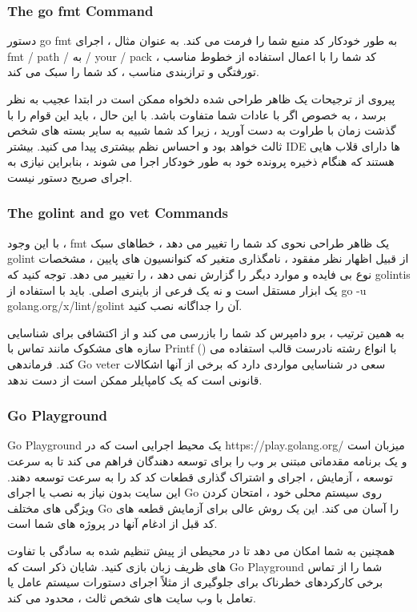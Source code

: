 \documentclass[12pt]{book}
\begin{document}
\subsubsection{The go fmt Command}
دستور go fmt به طور خودکار کد منبع شما را فرمت می کند.
به عنوان مثال ، اجرای fmt / path / به / your / pack کد شما را با اعمال استفاده از خطوط مناسب ، تورفتگی و ترازبندی مناسب ، کد شما را سبک می کند.

پیروی از ترجیحات یک ظاهر طراحی شده دلخواه ممکن است در ابتدا عجیب به نظر برسد ، به خصوص اگر با عادات شما متفاوت باشد.
با این حال ، باید این قوام را با گذشت زمان با طراوت به دست آورید ، زیرا کد شما شبیه به سایر بسته های شخص ثالث خواهد بود و احساس نظم بیشتری پیدا می کنید.
بیشتر IDE ها دارای قلاب هایی هستند که هنگام ذخیره پرونده خود به طور خودکار اجرا می شوند ، بنابراین نیازی به اجرای صریح دستور نیست.
\subsubsection{The golint and go vet Commands}
با این وجود ، fmt یک ظاهر طراحی نحوی کد شما را تغییر می دهد ، خطاهای سبک golint از قبیل اظهار نظر مفقود ، نامگذاری متغیر که کنوانسیون های پایین ، مشخصات نوع بی فایده و موارد دیگر را گزارش نمی دهد ، را تغییر می دهد.
توجه کنید که golintis یک ابزار مستقل است و نه یک فرعی از باینری اصلی.
باید با استفاده از go -u golang.org/x/lint/golint آن را جداگانه نصب کنید.

به همین ترتیب ، برو دامپرس کد شما را بازرسی می کند و از اکتشافی برای شناسایی سازه های مشکوک مانند تماس با Printf () با انواع رشته نادرست قالب استفاده می کند.
فرماندهی Go veter سعی در شناسایی مواردی دارد که برخی از آنها اشکالات قانونی است که یک کامپایلر ممکن است از دست ندهد.
\subsubsection{Go Playground}
Go Playground یک محیط اجرایی است که در https://play.golang.org/ میزبان است و یک برنامه مقدماتی مبتنی بر وب را برای توسعه دهندگان فراهم می کند تا به سرعت توسعه ، آزمایش ، اجرای و اشتراک گذاری قطعات کد کد را به سرعت توسعه دهند.
این سایت بدون نیاز به نصب یا اجرای Go روی سیستم محلی خود ، امتحان کردن ویژگی های مختلف Go را آسان می کند.
این یک روش عالی برای آزمایش قطعه های کد قبل از ادغام آنها در پروژه های شما است.

همچنین به شما امکان می دهد تا در محیطی از پیش تنظیم شده به سادگی با تفاوت های ظریف زبان بازی کنید.
شایان ذکر است که Go Playground شما را از تماس برخی کارکردهای خطرناک برای جلوگیری از مثلاً اجرای دستورات سیستم عامل یا تعامل با وب سایت های شخص ثالث ، محدود می کند.
\end{document}
